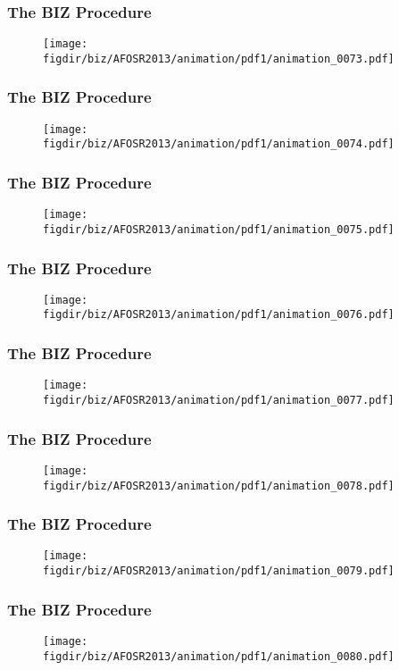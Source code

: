 \documentclass[13pt]{beamer}
\newcommand{\figdir}{../../fig}
\begin{document}
\begin{frame}\frametitle{The BIZ Procedure}\begin{figure}\texttt{[image: \\figdir/biz/AFOSR2013/animation/pdf1/animation\_0073.pdf]}\end{figure}\end{frame}
\begin{frame}\frametitle{The BIZ Procedure}\begin{figure}\texttt{[image: \\figdir/biz/AFOSR2013/animation/pdf1/animation\_0074.pdf]}\end{figure}\end{frame}
\begin{frame}\frametitle{The BIZ Procedure}\begin{figure}\texttt{[image: \\figdir/biz/AFOSR2013/animation/pdf1/animation\_0075.pdf]}\end{figure}\end{frame}
\begin{frame}\frametitle{The BIZ Procedure}\begin{figure}\texttt{[image: \\figdir/biz/AFOSR2013/animation/pdf1/animation\_0076.pdf]}\end{figure}\end{frame}
\begin{frame}\frametitle{The BIZ Procedure}\begin{figure}\texttt{[image: \\figdir/biz/AFOSR2013/animation/pdf1/animation\_0077.pdf]}\end{figure}\end{frame}
\begin{frame}\frametitle{The BIZ Procedure}\begin{figure}\texttt{[image: \\figdir/biz/AFOSR2013/animation/pdf1/animation\_0078.pdf]}\end{figure}\end{frame}
\begin{frame}\frametitle{The BIZ Procedure}\begin{figure}\texttt{[image: \\figdir/biz/AFOSR2013/animation/pdf1/animation\_0079.pdf]}\end{figure}\end{frame}
\begin{frame}\frametitle{The BIZ Procedure}\begin{figure}\texttt{[image: \\figdir/biz/AFOSR2013/animation/pdf1/animation\_0080.pdf]}\end{figure}\end{frame}
\end{document}
